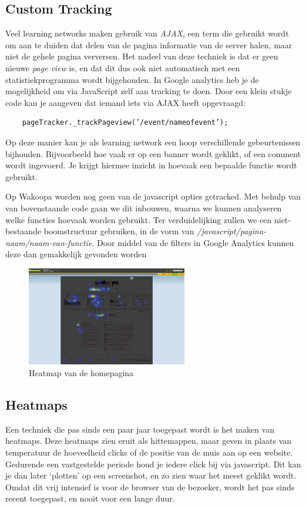 \documentclass[a4paper, 10pt, pdftex]{report}
\begin{document}
    \subsection{Custom Tracking}
    Veel learning networks maken gebruik van \emph{AJAX}, een term die gebruikt wordt om aan te duiden dat delen van de pagina informatie van de server halen, maar niet de gehele pagina verversen. Het nadeel van deze techniek is dat er geen nieuwe \emph{page view} is, en dat dit dus ook niet automatisch met een statistiekprogramma wordt bijgehouden. In Google analytics heb je de mogelijkheid om via JavaScript zelf aan tracking te doen. Door een klein stukje code kan je aangeven dat iemand iets via AJAX heeft opgevraagd:
    \begin{verbatim}
    pageTracker._trackPageview(’/event/nameofevent’);
    \end{verbatim}
    Op deze manier kan je als learning network een hoop verschillende gebeurtenissen bijhouden. Bijvoorbeeld hoe vaak er op een banner wordt geklikt, of een comment wordt ingevoerd. Je krijgt hiermee inzicht in hoevaak een bepaalde functie wordt gebruikt.

    Op Wakoopa worden nog geen van de javascript opties getracked. Met behulp van van bovenstaande code gaan we dit inbouwen, waarna we kunnen analyseren welke functies hoevaak worden gebruikt. Ter verduidelijking zullen we een niet-bestaande boomstructuur gebruiken, in de vorm van \emph{/javascript/pagina-naam/naam-van-functie}. Door middel van de filters in Google Analytics kunnen deze dan gemakkelijk gevonden worden



    \begin{figure}
      \begin{center}
        \includegraphics[width=70mm]{../images/heatmap}
      \caption{Heatmap van de homepagina}
      \label{heatmap}
      \end{center}
    \end{figure}

    \subsection{Heatmaps}
    Een techniek die pas sinds een paar jaar toegepast wordt is het maken van heatmaps. Deze heatmaps zien eruit als hittemappen, maar geven in plaats van temperatuur de hoeveelheid clicks of de positie van de muis aan op een website. Gedurende een vastgestelde periode houd je iedere click bij via javascript. Dit kan je dan later `plotten' op een screenshot, en zo zien waar het meest geklikt wordt. Omdat dit vrij intensief is voor de browser van de bezoeker, wordt het pas sinds recent toegepast, en nooit voor een lange duur.
\end{document}
